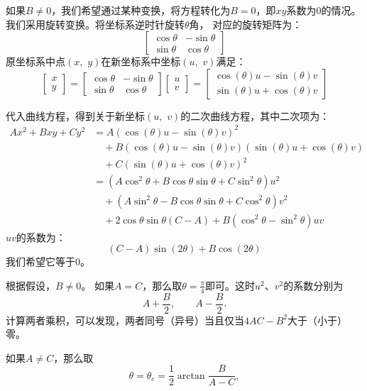 \documentclass[12pt,UTF8]{ctexbook}
\theoremstyle{definition}
\theoremstyle{plain}
\begin{document}
如果$B\neq 0$，我们希望通过某种变换，将方程转化为$B = 0$，即$xy$系数为$0$的情况。我们采用旋转变换。将坐标系逆时针旋转$\theta$角，
对应的旋转矩阵为：
$$
\begin{bmatrix}
    \cos{\theta} & -\sin{\theta} \\
    \sin{\theta} & \cos{\theta} 
\end{bmatrix}
$$
原坐标系中点$(x,\,\,y)$在新坐标系中坐标$(u,\,\,v)$满足：
$$
\begin{bmatrix}
    x \\ y
\end{bmatrix}
=
\begin{bmatrix}
    \cos{\theta} & -\sin{\theta} \\
    \sin{\theta} & \cos{\theta} 
\end{bmatrix}
\begin{bmatrix}
    u \\ v
\end{bmatrix}
= 
\begin{bmatrix}
    \cos{(\theta)}u - \sin{(\theta)}v \\ \sin{(\theta)}u + \cos{(\theta)}v
\end{bmatrix}
$$


代入曲线方程，得到关于新坐标$(u,\,\,v)$的二次曲线方程，其中二次项为：
\begin{align*}
    Ax^2 + Bxy + Cy^2 &= A(\cos{(\theta)}u - \sin{(\theta)}v)^2 \\
    &\quad + B(\cos{(\theta)}u - \sin{(\theta)}v)(\sin{(\theta)}u + \cos{(\theta)}v) \\
    &\quad + C(\sin{(\theta)}u + \cos{(\theta)}v)^2 \\
    &= (A\cos^2{\theta} + B\cos{\theta}\sin{\theta} + C\sin^2{\theta})u^2 \\
    &\quad + (A\sin^2{\theta} - B\cos{\theta}\sin{\theta} + C\cos^2{\theta})v^2 \\
    &\quad + 2\cos{\theta}\sin{\theta}(C - A) + B(\cos^2{\theta} - \sin^2{\theta})uv
\end{align*}
$uv$的系数为：
$$ (C - A)\sin{(2\theta)} + B\cos{(2\theta)} $$
我们希望它等于$0$。

根据假设，$B\neq 0$。
如果$A = C$，那么取$\theta = \frac{\pi}{4}$即可。这时$u^2$、$v^2$的系数分别为
$$ A + \frac{B}{2}, \qquad A - \frac{B}{2}. $$
计算两者乘积，可以发现，两者同号（异号）当且仅当$4AC - B^2$大于（小于）零。

如果$A\neq C$，那么取
$$\theta = \theta_c = \frac{1}{2} \arctan{\frac{B}{A - C}},$$
\end{document}
